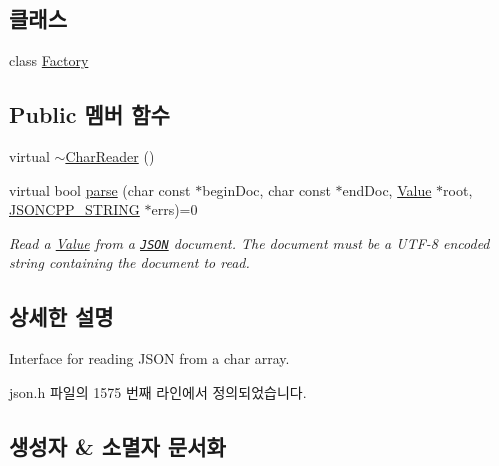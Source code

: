 \subsection*{클래스}
\begin{DoxyCompactItemize}
\item 
class \hyperlink{class_json_1_1_char_reader_1_1_factory}{Factory}
\end{DoxyCompactItemize}
\subsection*{Public 멤버 함수}
\begin{DoxyCompactItemize}
\item 
virtual \hyperlink{class_json_1_1_char_reader_acaa7b6ad04fe1cf2ddfca06e66550d7e}{$\sim$\+Char\+Reader} ()
\item 
virtual bool \hyperlink{class_json_1_1_char_reader_a7983680d50fd0745f371c43b162e78e1}{parse} (char const $\ast$begin\+Doc, char const $\ast$end\+Doc, \hyperlink{class_json_1_1_value}{Value} $\ast$root, \hyperlink{json_8h_a1e723f95759de062585bc4a8fd3fa4be}{J\+S\+O\+N\+C\+P\+P\+\_\+\+S\+T\+R\+I\+NG} $\ast$errs)=0
\begin{DoxyCompactList}\small\item\em Read a \hyperlink{class_json_1_1_value}{Value} from a \href{http://www.json.org}{\tt J\+S\+ON} document. The document must be a U\+T\+F-\/8 encoded string containing the document to read. \end{DoxyCompactList}\end{DoxyCompactItemize}


\subsection{상세한 설명}
Interface for reading J\+S\+ON from a char array. 

json.\+h 파일의 1575 번째 라인에서 정의되었습니다.



\subsection{생성자 \& 소멸자 문서화}
\mbox{\label{class_json_1_1_char_reader_acaa7b6ad04fe1cf2ddfca06e66550d7e}} 

